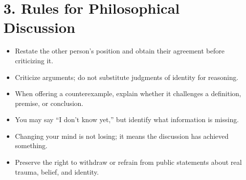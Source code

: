 \section*{3. Rules for Philosophical Discussion}
\begin{itemize}
\item Restate the other person's position and obtain their agreement before criticizing it.
\item Criticize arguments; do not substitute judgments of identity for reasoning.
\item When offering a counterexample, explain whether it challenges a definition, premise, or conclusion.
\item You may say ``I don't know yet,'' but identify what information is missing.
\item Changing your mind is not losing; it means the discussion has achieved something.
\item Preserve the right to withdraw or refrain from public statements about real trauma, belief, and identity.
\end{itemize}
